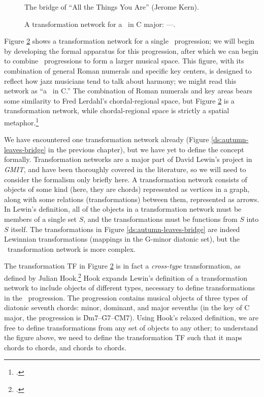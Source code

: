 \begin{figure}[tbp]
  \caption{The bridge of “All the Things You Are” (Jerome Kern).}
  \label{tf:all-things-bridge}
\end{figure}

\begin{figure}[tbp]
  \caption[A transformation network for a single \tfo\ progression.]{A
  transformation network for a \tfo\ in C major: ----.}
  \label{tf:single-tfo-network}
\end{figure}

Figure \ref{tf:single-tfo-network} shows a transformation network for a single
\tfo\ progression; we will begin by developing the formal apparatus for this
progression, after which we can begin to combine \tfo\ progressions to form a
larger musical space. This figure, with its combination of
general Roman numerals and specific key centers, is designed to reflect how
jazz musicians tend to talk about harmony; we might read this network as “a
\tfo\ in C.” The combination of Roman numerals and key areas bears some
similarity to Fred Lerdahl’s chordal-regional space, but Figure
\ref{tf:single-tfo-network} is a transformation network, while
chordal-regional space is strictly a spatial
metaphor.\footcite[96--97]{lerdahl:2004}

We have encountered one transformation network already (Figure
\ref{ds:autumn-leaves-bridge} in the previous chapter), but we have yet to
define the concept formally. Transformation networks are a major part of David
Lewin’s project in \emph{GMIT}, and have been thoroughly covered in the
literature, so we will need to consider the formalism only briefly
here. A transformation network consists of objects of some kind
(here, they are chords) represented as vertices in a graph, along with some
relations (transformations) between them, represented as arrows. In Lewin's
definition, all of the objects in a transformation network must be members of
a single set $S$, and the transformations must be functions from $S$ into $S$
itself. The transformations in Figure \ref{ds:autumn-leaves-bridge}
are indeed Lewinnian transformations (mappings in the G-minor diatonic set),
but the \tfo\ transformation network is more complex.

The transformation TF in Figure \ref{tf:single-tfo-network} is in fact a
\emph{cross-type} transformation, as defined by Julian
Hook.\footcite{hook:2007} Hook expands Lewin’s definition of a transformation
network to include objects of different types, necessary to define
transformations in the \tfo\ progression. The progression contains musical
objects of three types of diatonic seventh chords: minor, dominant,
and major sevenths (in the key of C major, the progression is
\h{Dm7}--\h{G7}--\h{CM7}). Using Hook's relaxed definition, we are free to
define transformations from any set of objects to any other; to understand the
figure above, we need to define the transformation TF such that it maps
\ii chords to \V chords, and \V chords to \I
chords.

